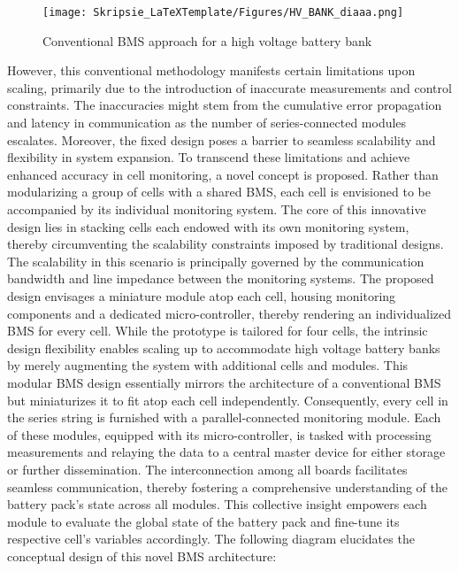 \begin{figure}[h!]
\centering
\texttt{[image: Skripsie\_LaTeXTemplate/Figures/HV\_BANK\_diaaa.png]}
\caption{Conventional BMS approach for a high voltage battery bank\cite{generic}}
\label{fig:Conventional}
\end{figure}
\noindent
However, this conventional methodology manifests certain limitations upon scaling, primarily due to the introduction of inaccurate measurements and control constraints. The inaccuracies might stem from the cumulative error propagation and latency in communication as the number of series-connected modules escalates. Moreover, the fixed design poses a barrier to seamless scalability and flexibility in system expansion.\newline\newline
\noindent
To transcend these limitations and achieve enhanced accuracy in cell monitoring, a novel concept is proposed. Rather than modularizing a group of cells with a shared BMS, each cell is envisioned to be accompanied by its individual monitoring system. The core of this innovative design lies in stacking cells each endowed with its own monitoring system, thereby circumventing the scalability constraints imposed by traditional designs. The scalability in this scenario is principally governed by the communication bandwidth and line impedance between the monitoring systems.\newline\newline
\noindent
The proposed design envisages a miniature module atop each cell, housing monitoring components and a dedicated micro-controller, thereby rendering an individualized BMS for every cell. While the prototype is tailored for four cells, the intrinsic design flexibility enables scaling up to accommodate high voltage battery banks by merely augmenting the system with additional cells and modules.\newline\newline
\noindent
This modular BMS design essentially mirrors the architecture of a conventional BMS but miniaturizes it to fit atop each cell independently. Consequently, every cell in the series string is furnished with a parallel-connected monitoring module. Each of these modules, equipped with its micro-controller, is tasked with processing measurements and relaying the data to a central master device for either storage or further dissemination. The interconnection among all boards facilitates seamless communication, thereby fostering a comprehensive understanding of the battery pack's state across all modules. This collective insight empowers each module to evaluate the global state of the battery pack and fine-tune its respective cell’s variables accordingly. The following diagram elucidates the conceptual design of this novel BMS architecture:

